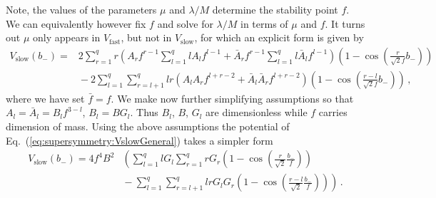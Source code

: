 \documentclass[11pt]{article}
\begin{document}
Note, the values of the parameters $\mu$ and $\lambda / M$ determine the stability point $f$.
We can equivalently however fix $f$ and solve for $\lambda / M$ in terms of $\mu$ and $f$.
It turns out $\mu$ only appears in $V_\text{fast}$, but not in $V_\text{slow}$, for which an explicit form is given by
\begin{equation} \label{eq:supersymmetry:VslowGeneral}
  \begin{aligned}
    V_\text{slow}\left(b_-\right) =
      &2 \sum_{r = 1}^q r
        \left(A_r f^{r - 1} \sum_{l = 1}^q l A_l f^{l - 1}
          + \bar A_r f^{r - 1} \sum_{l = 1}^q l \bar A_l f^{l - 1}\right)
        \left(1 - \cos\left(\frac{r}{\sqrt 2 f} b_-\right)\right)\\
      &{} - 2 \sum_{l = 1}^q \sum_{r = l + 1}^q
        l r \left(A_l A_r f^{l + r - 2} + \bar A_l \bar A_r f^{l + r - 2}\right)
        \left(1 - \cos\left(\frac{r - l}{\sqrt 2 f} b_-\right)\right)\,,
  \end{aligned}
\end{equation}
where we have set $\bar f = f$.
We make now further simplifying assumptions so that $A_l = \bar A_l = B_l f^{3 - l}$, $B_l = B G_l$.
Thus $B_l$, $B$, $G_l$ are dimensionless while $f$ carries dimension of mass.
Using the above assumptions the potential of Eq.~(\ref{eq:supersymmetry:VslowGeneral}) takes a simpler form
\begin{equation} \label{eq:supersymmetry:Vslow}
  \begin{aligned}
    V_\text{slow}\left(b_-\right) = 4 f^4 B^2 &\left(
      \sum_{l = 1}^q l G_l \sum_{r = 1}^q r G_r
        \left(1 - \cos\left(\frac{r}{\sqrt{2}} \frac{b_-}{f}\right)\right)\right. \\
      &\left.{} - \sum_{l = 1}^q \sum_{r = l + 1}^q l r G_l G_r
        \left(1 - \cos\left(\frac{r - l}{\sqrt{2}} \frac{b_-}{f}\right)\right)
    \right)\,.
  \end{aligned}
\end{equation}
\end{document}
